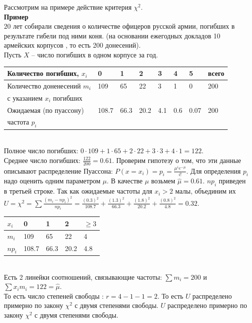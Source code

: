 \documentclass[russian, 12pt, fleqn]{article}
\begin{document}
Рассмотрим на примере действие критерия $\chi^2$.\\
\textbf{Пример}\\
$20$ лет собирали сведения о количестве офицеров русской армии, погибших в результате гибели под ними коня. (на основании ежегодных докладов 10 армейских корпусов , то есть 200 донесений).\\
Пусть $X$ -- число погибших в одном корпусе за год.\\
\begin{tabular}[b]{ | l |  l | l |  l |   l |   l |   l |   l |     }
\hline
Количество погибших, $x_i$ &0&1&2&3&4&5& всего\\
\hline
Количество доненесений $m_i$ &109&65&22&3&1&0&200\\
с указанием $x_i$ погибших& &  & & & & &\\
\hline
Ожидаемая (по пуассону)& 108.7&66.3&20.2&4.1&0.6&0.07&200\\
частота $p_i$& & & & & & & \\
\hline
\end{tabular}\\
Полное число погибших: $0\cdot 109 + 1 \cdot 65 + 2 \cdot 22 + 3 \cdot 3 + 4 \cdot 1=122$.\\
Среднее число погибших: $\frac{122}{200} = 0.61$. Проверим гипотезу о том, что эти данные описывают распределение Пуассона: $P(x = x_i) = p_i = \frac{\mu^ie^{-\mu}}{i!}$. Для определения $p_i$ надо оценить одним параметром $\mu$. В качестве $\mu$ возьмем $\hat{\mu} = 0.61$. $np_i$ приведен в третьей строке. Так как ожидаемые частоты для $x_i > 2$ малы, объединим их $U = \chi^2 = \displaystyle{\sum } \frac{(m_i - np_i)^2}{np_i} = \frac{(0.3)^2}{108.7} + \frac{(1.3)^2}{66.3} + \frac{(1.8)^2}{20.2} + \frac{(0.8)^2}{4.8} = 0.32$. \\
\begin{tabular}[b]{ | l |  l | l |  l |   l |     }
\hline
$x_i$&0&1&2&$\geq 3$\\
\hline
$m_i$&109&65&22&4\\
\hline
$np_i$&108.7&66.3&20.2&4.8\\
\hline
\end{tabular}\\
Есть 2 линейки соотношений, связывающие частоты: $\displaystyle{\sum\limits} m_i = 200$ и $\displaystyle{\sum\limits} x_im_i = 122 = \hat{\mu}$.\\
То есть число степеней свободы : $r = 4 - 1 - 1 = 2$. То есть $U$ распределено примерно  по закону $\chi^2$ с двумя степенями свободы. $U$ распределено примерно по закону $\chi^2$ с двумя степенями свободы.\\
\end{document}
